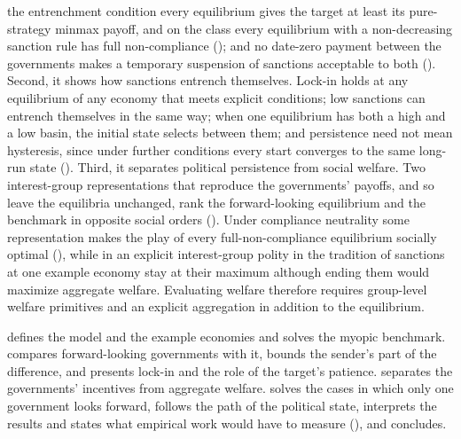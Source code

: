 the entrenchment condition every equilibrium gives the target at least its
pure-strategy minmax payoff, and on the class every equilibrium with a
non-decreasing sanction rule has full non-compliance (); and
no date-zero payment between the governments makes a temporary suspension of
sanctions acceptable to both (). Second, it shows how
sanctions entrench themselves. Lock-in holds at any equilibrium of any economy that
meets explicit conditions; low sanctions can entrench themselves in the same way;
when one equilibrium has both a high and a low basin, the initial state selects
between them; and persistence need not mean hysteresis, since under further
conditions every start converges to the same long-run state
(). Third, it separates political persistence from social
welfare. Two interest-group representations that reproduce the governments'
payoffs, and so leave the equilibria unchanged, rank the forward-looking
equilibrium and the benchmark in opposite social orders
(). Under compliance neutrality some
representation makes the play of every full-non-compliance equilibrium socially optimal
(), while in an explicit interest-group
polity in the tradition of \citet{Kaempfer1988} sanctions at one example economy
stay at their maximum although ending them would maximize aggregate welfare.
Evaluating welfare therefore requires group-level welfare primitives and an
explicit aggregation in addition to the equilibrium.

  defines the model and the example economies and solves
the myopic benchmark.  compares forward-looking governments with
it, bounds the sender's part of the difference, and presents lock-in and the role
of the target's patience.  separates the governments'
incentives from aggregate welfare.  solves the cases in which
only one government looks forward, follows the path of the political state,
interprets the results and
states what empirical work would have to measure (),
and  concludes.
